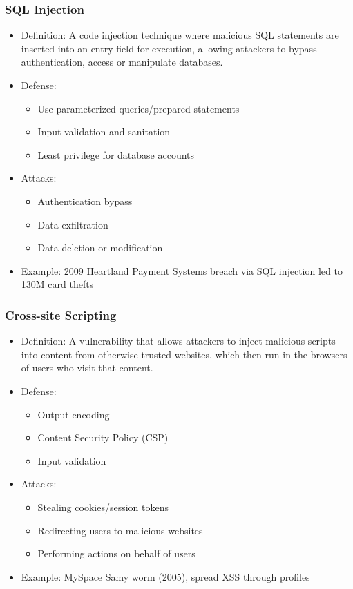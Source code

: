 \documentclass[11pt]{article}
\begin{document}
\subsubsection{SQL Injection}
\label{sec:orgd5323e7}
\begin{itemize}
\item Definition: A code injection technique where malicious SQL statements are inserted into an entry field for execution, allowing attackers to bypass authentication, access or manipulate databases.
\item Defense:
\begin{itemize}
\item Use parameterized queries/prepared statements
\item Input validation and sanitation
\item Least privilege for database accounts
\end{itemize}
\item Attacks:
\begin{itemize}
\item Authentication bypass
\item Data exfiltration
\item Data deletion or modification
\end{itemize}
\item Example: 2009 Heartland Payment Systems breach via SQL injection led to 130M card thefts
\end{itemize}
\subsubsection{Cross-site Scripting}
\label{sec:org110fff8}
\begin{itemize}
\item Definition: A vulnerability that allows attackers to inject malicious scripts into content from otherwise trusted websites, which then run in the browsers of users who visit that content.
\item Defense:
\begin{itemize}
\item Output encoding
\item Content Security Policy (CSP)
\item Input validation
\end{itemize}
\item Attacks:
\begin{itemize}
\item Stealing cookies/session tokens
\item Redirecting users to malicious websites
\item Performing actions on behalf of users
\end{itemize}
\item Example: MySpace Samy worm (2005), spread XSS through profiles
\end{itemize}
\end{document}
